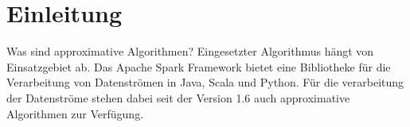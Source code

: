 \section{Einleitung}
Was sind approximative Algorithmen?
Eingesetzter Algorithmus hängt von Einsatzgebiet ab.
Das Apache Spark Framework bietet eine Bibliotheke für die Verarbeitung von Datenströmen in Java, Scala und Python. Für die verarbeitung der Datenströme stehen dabei seit der Version 1.6 auch approximative Algorithmen zur Verfügung.




